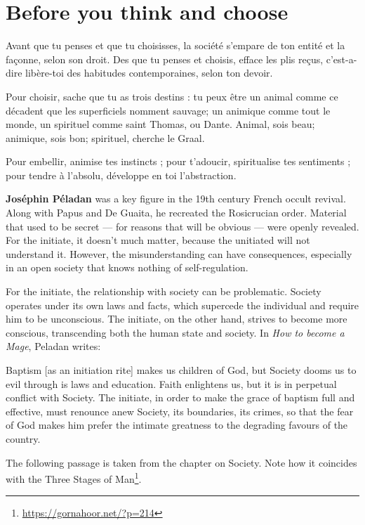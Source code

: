 \section{Before you think and choose}

\begin{quotex}
Avant que tu penses et que tu choisisses, la société s'empare de ton entité et la façonne, selon son droit. Des que tu penses et choisis, efface les plis reçus, c'est-a-dire libère-toi des habitudes contemporaines, selon ton devoir.

Pour choisir, sache que tu as trois destins : tu peux être un animal comme ce décadent que les superficiels nomment sauvage; un animique comme tout le monde, un spirituel comme saint Thomas, ou Dante. Animal, sois beau; animique, sois bon; spirituel, cherche le Graal.

Pour embellir, animise tes instincts ; pour t'adoucir, spiritualise tes sentiments ; pour tendre à l'absolu, développe en toi l'abstraction.

\end{quotex}

\textbf{Joséphin Péladan} was a key figure in the 19th century French occult revival. Along with Papus and De Guaita, he recreated the Rosicrucian order. Material that used to be secret — for reasons that will be obvious — were openly revealed. For the initiate, it doesn't much matter, because the unitiated will not understand it. However, the misunderstanding can have consequences, especially in an open society that knows nothing of self-regulation. 

For the initiate, the relationship with society can be problematic. Society operates under its own laws and facts, which supercede the individual and require him to be unconscious. The initiate, on the other hand, strives to become more conscious, transcending both the human state and society. In \textit{How to become a Mage}, Peladan writes:

\begin{quotex}
Baptism [as an initiation rite] makes us children of God, but Society dooms us to evil through is laws and education. Faith enlightens us, but it is in perpetual conflict with Society. The initiate, in order to make the grace of baptism full and effective, must renounce anew Society, its boundaries, its crimes, so that the fear of God makes him prefer the intimate greatness to the degrading favours of the country. 

\end{quotex}
The following passage is taken from the chapter on Society. Note how it coincides with the Three Stages of Man\footnote{\url{https://gornahoor.net/?p=214}}.

